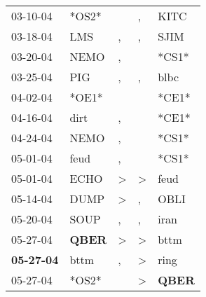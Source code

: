 \begin{supertabular}{p{0.07\textwidth}p{0.06\textwidth}p{0.02\textwidth}p{0.02\textwidth}p{0.06\textwidth}}
          03-10-04\textsuperscript{} &                            *OS2* &                  &                , &           KITC\textsuperscript{} \\
          03-18-04\textsuperscript{} &            LMS\textsuperscript{} &                , &                , &           SJIM\textsuperscript{} \\
          03-20-04\textsuperscript{} &           NEMO\textsuperscript{} &                , &                  &                            *CS1* \\
          03-25-04\textsuperscript{} &            PIG\textsuperscript{} &                , &                , &           blbc\textsuperscript{} \\
          04-02-04\textsuperscript{} &                            *OE1* &                  &                  &                            *CE1* \\
          04-16-04\textsuperscript{} &           dirt\textsuperscript{} &                , &                  &                            *CE1* \\
          04-24-04\textsuperscript{} &           NEMO\textsuperscript{} &                , &                  &                            *CS1* \\
          05-01-04\textsuperscript{} &           feud\textsuperscript{} &                , &                  &                            *CS1* \\
          05-01-04\textsuperscript{} &           ECHO\textsuperscript{} &     \textgreater &     \textgreater &           feud\textsuperscript{} \\
          05-14-04\textsuperscript{} &           DUMP\textsuperscript{} &     \textgreater &                , &           OBLI\textsuperscript{} \\
          05-20-04\textsuperscript{} &           SOUP\textsuperscript{} &                , &                , &           iran\textsuperscript{} \\
          05-27-04\textsuperscript{} &  \textbf{QBER\textsuperscript{}} &     \textgreater &     \textgreater &           bttm\textsuperscript{} \\
 \textbf{05-27-04\textsuperscript{}} &           bttm\textsuperscript{} &                , &     \textgreater &           ring\textsuperscript{} \\
          05-27-04\textsuperscript{} &                            *OS2* &                  &     \textgreater &  \textbf{QBER\textsuperscript{}} \\

\end{supertabular}
